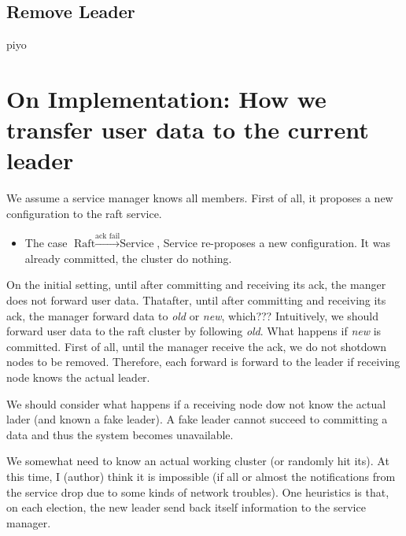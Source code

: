 \documentclass[sigconf,nonacm]{acmart}
\begin{document}
\subsection{Remove Leader}
piyo

\section{On Implementation: How we transfer user data to the current leader}

We assume a service manager knows all members.
First of all, it proposes a new configuration to the raft service.
\begin{itemize}
\item The case $\text{Raft} \xrightarrow{\text{ack fail}} \text{Service}$, Service re-proposes a new configuration. It was already committed, the cluster do nothing.
\end{itemize}
On the initial setting, until after committing and receiving its ack, the manger does not forward user data.
Thatafter, until after committing and receiving its ack, the manager forward data to \emph{old} or \emph{new}, which???
Intuitively, we should forward user data to the raft cluster by following \emph{old}.
What happens if \emph{new} is committed.
First of all, until the manager receive the ack, we do not shotdown nodes to be removed.
Therefore, each forward is forward to the leader if receiving node knows the actual leader.

We should consider what happens if a receiving node dow not know the actual lader (and known a fake leader).
A fake leader cannot succeed to committing a data and thus the system becomes unavailable.

We somewhat need to know an actual working cluster (or randomly hit its).
At this time, I (author) think it is impossible (if all or almost the notifications from the service drop due to some kinds of network troubles).
One heuristics is that, on each election, the new leader send back itself information to the service manager.
\end{document}
